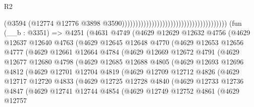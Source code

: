 \begin{lexlean}{R2}
\begin{coremodule}
                                                                              (@3594
                                                                                (@12774
                                                                                  @12776
                                                                                  @3898
                                                                                  @3590)))))))))))))))))))))))))))))))))))))))
    (fun (__b : @3351) =>
    @4251
      (@4631
        @4749
        (@4629
          @12629
          @12632
          @4756
          (@4629
            @12637
            @12640
            @4763
            (@4629
              @12645
              @12648
              @4770
              (@4629
                @12653
                @12656
                @4777
                (@4629
                  @12661
                  @12664
                  @4784
                  (@4629
                    @12669
                    @12672
                    @4791
                    (@4629
                      @12677
                      @12680
                      @4798
                      (@4629
                        @12685
                        @12688
                        @4805
                        (@4629
                          @12693
                          @12696
                          @4812
                          (@4629
                            @12701
                            @12704
                            @4819
                            (@4629
                              @12709
                              @12712
                              @4826
                              (@4629
                                @12717
                                @12720
                                @4833
                                (@4629
                                  @12725
                                  @12728
                                  @4840
                                  (@4629
                                    @12733
                                    @12736
                                    @4847
                                    (@4629
                                      @12741
                                      @12744
                                      @4854
                                      (@4629
                                        @12749
                                        @12752
                                        @4861
                                        (@4629
                                          @12757

\end{coremodule}
\end{lexlean}
